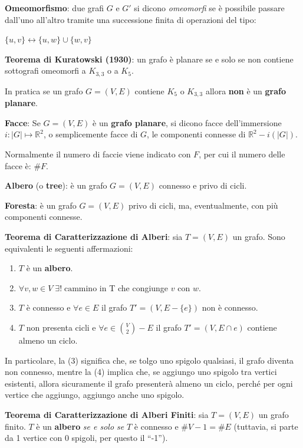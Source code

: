 \newpage
\begin{flushleft}
    \textbf{Omeomorfismo}: due grafi $G$ e $G'$ si dicono \textit{omeomorfi} se è possibile passare dall'uno all'altro tramite una successione finita di operazioni del tipo:

    {\centering
        $\{u, v\} \leftrightarrow \{u, w\} \cup \{w, v\}$
    \par}

    \textbf{Teorema di Kuratowski (1930)}: un grafo è planare se e solo se non contiene sottografi omeomorfi a $K_{3,3}$ o a $K_5$.

    In pratica se un grafo $G = (V, E)$ contiene $K_5$ o $K_{3,3}$ allora \textbf{non} è un \textbf{grafo planare}.

    \textbf{Facce}: Se $G = (V, E)$ è un \textbf{grafo planare}, si dicono facce dell'immersione $i: |G| \mapsto \mathbb{R}^2$, o semplicemente facce di $G$, le componenti connesse di $\mathbb{R}^2 - i(|G|)$.

    Normalmente il numero di faccie viene indicato con $F$, per cui il numero delle facce è: $\# F$.

    \textbf{Albero} (o \textbf{tree}): è un grafo $G = (V, E)$ connesso e privo di cicli.

    \textbf{Foresta}: è un grafo $G = (V, E)$ privo di cicli, ma, eventualmente, con più componenti connesse.

    \textbf{Teorema di Caratterizzazione di Alberi}: sia $T = (V, E)$ un grafo. Sono equivalenti le seguenti affermazioni:
    \begin{enumerate}[nosep]
        \item $T$ è un \textbf{albero}.
        \item $\forall v, w \in V \; \exists! \; \text{cammino}$ in T che congiunge $v$ con $w$.
        \item $T$ è connesso e $\forall e \in E$ il grafo $T' = (V, E - \{e\})$ non è connesso.
        \item $T$ non presenta cicli e $\forall e \in \binom{V}{2} - E$ il grafo $T' = (V, E \cap {e})$ contiene almeno un ciclo.
    \end{enumerate}
    In particolare, la (3) significa che, se tolgo uno spigolo qualsiasi, il grafo diventa non connesso, mentre la (4) implica che, se aggiungo uno spigolo tra vertici esistenti, allora sicuramente il grafo presenterà almeno un ciclo, perché per ogni vertice che aggiungo, aggiungo anche uno spigolo.

    \textbf{Teorema di Caratterizzazione di Alberi Finiti}: sia $T = (V, E)$ un grafo finito. $T$ è un \textbf{albero} \textit{se e solo se} $T$ è connesso e $\# V - 1 = \# E$ (tuttavia, si parte da 1 vertice con 0 spigoli, per questo il ``-1'').
\end{flushleft}

